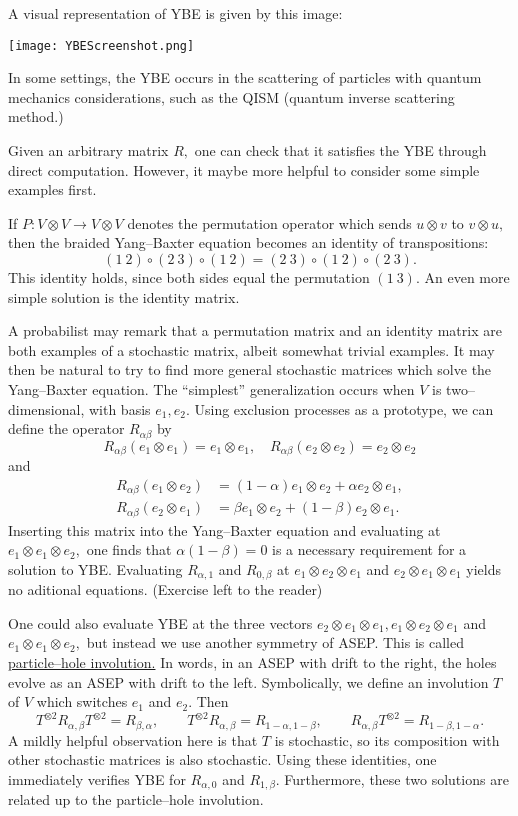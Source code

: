 \documentclass{ximera}
\begin{document}
A visual representation of YBE is given by this image:

\texttt{[image: YBEScreenshot.png]}

In some settings, the YBE occurs in the scattering of particles with quantum mechanics considerations, 
such as the QISM (quantum inverse scattering method.)

Given an arbitrary matrix \(R,\) one can check that it satisfies the YBE
through direct computation. However, it maybe more helpful to consider some simple examples first. 

If \(P: V \otimes V \rightarrow V \otimes V\) denotes the permutation operator which sends
\(u \otimes v\) to \(v \otimes u,\) then the braided Yang--Baxter equation becomes an identity of transpositions:
\[
(1\ 2) \circ (2 \ 3 ) \circ (1 \ 2 ) = (2 \ 3) \circ (1 \ 2) \circ (2 \ 3).
\]
This identity holds, since both sides equal the permutation \((1\ 3).\) An even more simple solution is 
the identity matrix. 

A probabilist may remark that a permutation matrix and an identity matrix are both examples of a stochastic matrix,
albeit somewhat trivial examples. It may then be natural to try to find more general stochastic matrices
which solve the Yang--Baxter equation. The ``simplest'' generalization occurs when \(V\) is two--dimensional,
with basis \(e_1,e_2.\) Using exclusion processes as a prototype, we can define the operator $R_{\alpha\beta}$
by
\[
R_{\alpha\beta}(e_1 \otimes e_1) = e_1 \otimes e_1, \quad R_{\alpha\beta}(e_2\otimes e_2) = e_2 \otimes e_2
\]
and
\begin{align*}
R_{\alpha\beta}(e_1 \otimes e_2) &= (1-\alpha)e_1 \otimes e_2 + \alpha e_2 \otimes e_1,\\
R_{\alpha\beta}(e_2 \otimes e_1) &= \beta e_1\otimes e_2 + (1-\beta)e_2 \otimes e_1.
\end{align*}
Inserting this matrix into the Yang--Baxter equation and evaluating at \(e_1 \otimes e_1 \otimes e_2,\)
one finds that \(\alpha(1-\beta)=0\) is a necessary requirement for a solution to YBE. Evaluating
\( R_{\alpha,1}\) and \(R_{0,\beta}\) at \(e_1\otimes e_2 \otimes e_1\) and \(e_2 \otimes e_1 \otimes e_1\)
yields no aditional equations. (Exercise left to the reader)

One could also evaluate YBE at the three vectors \(e_2 \otimes e_1 \otimes e_1,e_1\otimes e_2 \otimes e_1\)
and \(e_1 \otimes e_1 \otimes e_2,\) but instead we use another symmetry of ASEP. This is called
\underline{particle--hole involution.} In words, in an ASEP with drift to the right, the holes evolve
as an ASEP with drift to the left. Symbolically, we define an involution \(T\) of \(V\) which
switches \(e_1\) and \(e_2.\) Then 
\[
T^{\otimes 2} R_{\alpha,\beta}T^{\otimes 2} = R_{\beta,\alpha}, \quad \quad T^{\otimes 2} R_{\alpha,\beta} = R_{1-\alpha,1-\beta}, \quad \quad R_{\alpha,\beta}T^{\otimes 2} = R_{1-\beta,1-\alpha}.
\]
A mildly helpful observation here is that \(T\) is stochastic, so its composition with other stochastic
matrices is also stochastic. Using these identities, one immediately verifies YBE for 
\(R_{\alpha,0}\) and \(R_{1,\beta}.\) Furthermore, these two solutions are related up to the particle--hole involution.
\end{document}
